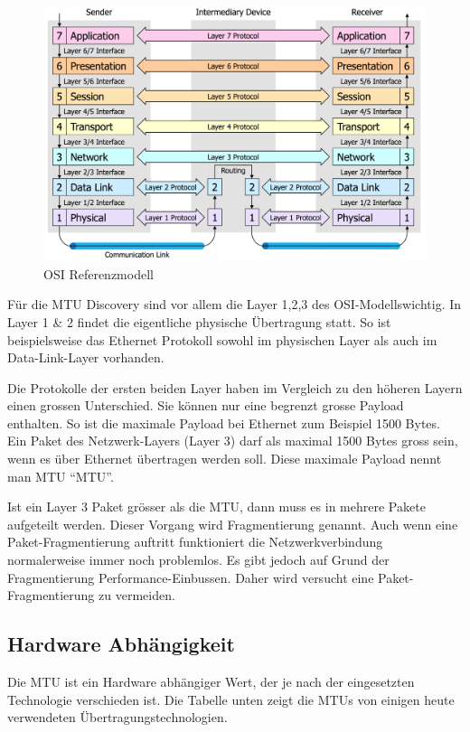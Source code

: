 \begin{figure}[H]
    \begin{center}
        \includegraphics[trim=1 0 0 0,clip,width=\textwidth]{mainpart/analyse/img/OSI_Modell}
    \end{center}
    \caption{\ac{OSI} Referenzmodell}
\end{figure}

Für die \ac{MTU} Discovery sind vor allem die Layer 1,2,3 des \ac{OSI}-Modells\footnotemark[1] wichtig. In Layer 1 \& 2 findet die eigentliche physische Übertragung statt. So ist beispielsweise das Ethernet Protokoll sowohl im physischen Layer als auch im Data-Link-Layer vorhanden.

Die Protokolle der ersten beiden Layer haben im Vergleich zu den höheren Layern einen grossen Unterschied. Sie können nur eine begrenzt grosse Payload enthalten. So ist die maximale Payload bei Ethernet zum Beispiel 1500 Bytes. Ein Paket des Netzwerk-Layers (Layer 3) darf als maximal 1500 Bytes gross sein, wenn es über Ethernet übertragen werden soll. Diese maximale Payload nennt man \acl{MTU} \enquote{\acs{MTU}}.


Ist ein Layer 3 Paket grösser als die \ac{MTU}, dann muss es in mehrere Pakete aufgeteilt werden. Dieser Vorgang wird Fragmentierung genannt. Auch wenn eine Paket-Fragmentierung auftritt funktioniert die Netzwerkverbindung normalerweise immer noch problemlos. Es gibt jedoch auf Grund der Fragmentierung Performance-Einbussen. Daher wird versucht eine Paket-Fragmentierung zu vermeiden.

\subsection{Hardware Abhängigkeit}
Die \ac{MTU} ist ein Hardware abhängiger Wert, der je nach der eingesetzten Technologie verschieden ist. Die Tabelle unten zeigt die \ac{MTU}s von einigen heute verwendeten Übertragungstechnologien.

